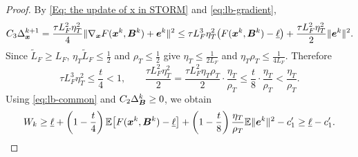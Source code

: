 \begin{proof}
By \eqref{Eq: the update of x in STORM} and \eqref{eq:lb-gradient},
\[
C_3\Delta_{\bm{x}}^{k+1}
=\frac{\tau L_F^2\eta_T^2}{4}\|\nabla_{\bm{x}}F(\bm{x}^k,\bm{B}^k)+\bm{e}^k\|^2
\le\tau L_F^3\eta_T^2\bigl(F(\bm{x}^k,\bm{B}^k)-\underline{\ell}\bigr)+\frac{\tau L_F^2\eta_T^2}{2}\|\bm{e}^k\|^2 .
\]
Since $\tilde L_F\ge L_F$, $\eta_T\tilde L_F\le\frac12$ and $\rho_T\le\frac12$ give $\eta_T\le\frac{1}{2L_F}$ and $\eta_T\rho_T\le\frac{1}{4L_F}$. Therefore
\[
\tau L_F^3\eta_T^2\le\frac t4<1,
\qquad
\frac{\tau L_F^2\eta_T^2}{2}=\frac{\tau L_F^2\eta_T\rho_T}{2}\cdot\frac{\eta_T}{\rho_T}\le\frac t8\cdot\frac{\eta_T}{\rho_T}<\frac{\eta_T}{\rho_T}.
\]
Using \eqref{eq:lb-common} and $C_2\Delta_{\bm{B}}^k\ge0$, we obtain
\[
W_k\ge\underline{\ell}+\left(1-\frac t4\right)\mathbb{E}\bigl[F(\bm{x}^k,\bm{B}^k)-\underline{\ell}\bigr]+\left(1-\frac t8\right)\frac{\eta_T}{\rho_T}\mathbb{E}\|\bm{e}^k\|^2-c_1'\ge\underline{\ell}-c_1' .
\]
\end{proof}
\endgroup

